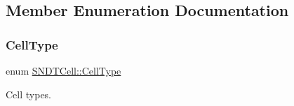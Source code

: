 \subsection{Member Enumeration Documentation}
\mbox{\label{classSNDTCell_a89f320f167cfeb7ccdbb4a578a169341}} 
\subsubsection{\texorpdfstring{Cell\+Type}{CellType}}
{\footnotesize\ttfamily enum \hyperlink{classSNDTCell_a89f320f167cfeb7ccdbb4a578a169341}{S\+N\+D\+T\+Cell\+::\+Cell\+Type}}



Cell types. 

